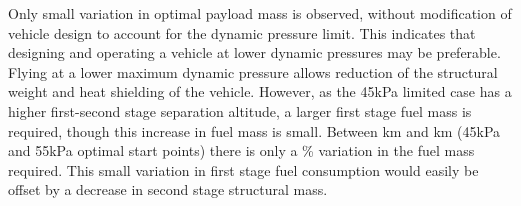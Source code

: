 Only small variation in optimal payload mass is observed, without modification of vehicle design to account for the dynamic pressure limit. This indicates that designing and operating a vehicle at lower dynamic pressures may be preferable. Flying at a lower maximum dynamic pressure allows reduction of the structural weight and heat shielding of the vehicle. However, as the 45kPa limited case has a higher first-second stage separation altitude, a larger first stage fuel mass is required, though this increase in fuel mass is small. Between \FirstStageAltFortyFive km  and \FirstStageAltFiftyFive km (45kPa and 55kPa optimal start points) there is only a \FirstStagemincrease \% variation in the fuel mass required. This small variation in first stage fuel consumption would easily be offset by a decrease in second stage structural mass. 



